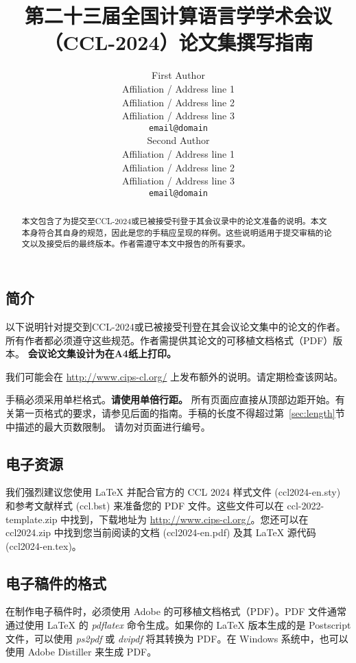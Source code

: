 \documentclass[11pt]{article}
\title{第二十三届全国计算语言学学术会议（CCL-2024）论文集撰写指南}
\author{First Author \\
  Affiliation / Address line 1 \\
  Affiliation / Address line 2 \\
  Affiliation / Address line 3 \\
  {\tt email@domain} \\\And
  Second Author \\
  Affiliation / Address line 1 \\
  Affiliation / Address line 2 \\
  Affiliation / Address line 3 \\
  {\tt email@domain} \\}
\date{}
\begin{document}
\begin{CJK*}{UTF8}{gbsn}
\maketitle
\begin{abstract}
  本文包含了为提交至CCL-2024或已被接受刊登于其会议录中的论文准备的说明。本文本身符合其自身的规范，因此是您的手稿应呈现的样例。这些说明适用于提交审稿的论文以及接受后的最终版本。作者需遵守本文中报告的所有要求。
\end{abstract}
\section{简介}
\label{intro}


以下说明针对提交到CCL-2024或已被接受刊登在其会议论文集中的论文的作者。所有作者都必须遵守这些规范。作者需提供其论文的可移植文档格式（PDF）版本。 \textbf{会议论文集设计为在A4纸上打印。}

我们可能会在 \url{http://www.cips-cl.org/} 上发布额外的说明。请定期检查该网站。

手稿必须采用单栏格式。{\bf 请使用单倍行距。} 所有页面应直接从顶部边距开始。有关第一页格式的要求，请参见后面的指南。手稿的长度不得超过第~\ref{sec:length}节中描述的最大页数限制。
请勿对页面进行编号。
\subsection{电子资源}

我们强烈建议您使用 \LaTeX{} 并配合官方的 CCL 2024 样式文件 (ccl2024-en.sty) 和参考文献样式 (ccl.bst) 来准备您的 PDF 文件。这些文件可以在 ccl-2022-template.zip 中找到，下载地址为 \url{http://www.cips-cl.org/}。您还可以在 ccl2024.zip 中找到您当前阅读的文档 (ccl2024-en.pdf) 及其 \LaTeX{} 源代码 (ccl2024-en.tex)。
\subsection{电子稿件的格式}
\label{sect:pdf}

在制作电子稿件时，必须使用 Adobe 的可移植文档格式（PDF）。PDF 文件通常通过使用 \LaTeX{} 的 \textit{pdflatex} 命令生成。如果你的 \LaTeX{} 版本生成的是 Postscript 文件，可以使用 \textit{ps2pdf} 或 \textit{dvipdf} 将其转换为 PDF。在 Windows 系统中，也可以使用 Adobe Distiller 来生成 PDF。


\end{CJK*}
\end{document}
